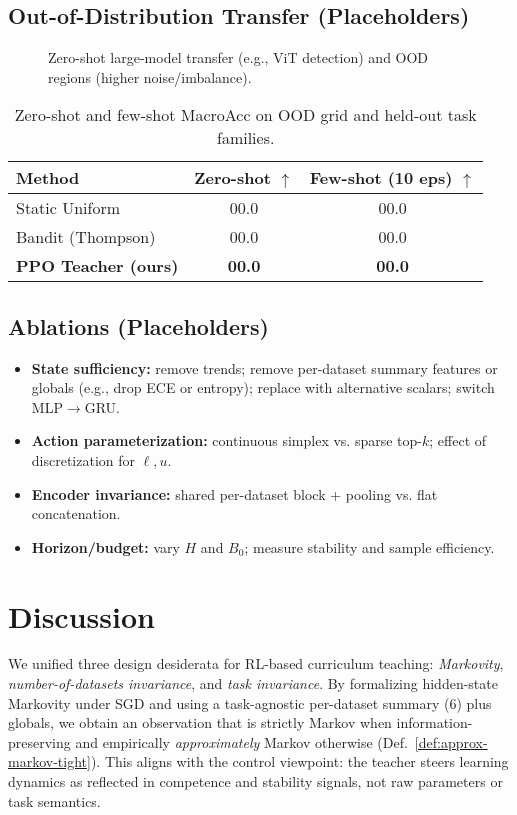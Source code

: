 \documentclass[11pt]{article}
\newcommand{\1}{\mathbf{1}}
\begin{document}
\subsection{Out-of-Distribution Transfer (Placeholders)}
\begin{figure}[H]
  \centering
  \fbox{\rule{0pt}{2in}\rule{0.95\linewidth}{0pt}}
  \caption{Zero-shot large-model transfer (e.g., ViT detection) and OOD regions (higher noise/imbalance).}
  \label{fig:ood}
\end{figure}

\begin{table}[H]
\centering
\caption{Zero-shot and few-shot MacroAcc on OOD grid and held-out task families.}
\label{tab:ood}
\begin{tabular}{lcc}
\toprule
Method & Zero-shot $\uparrow$ & Few-shot (10 eps) $\uparrow$ \\
\midrule
Static Uniform & 00.0 & 00.0 \\
Bandit (Thompson) & 00.0 & 00.0 \\
\textbf{PPO Teacher (ours)} & \textbf{00.0} & \textbf{00.0} \\
\bottomrule
\end{tabular}
\end{table}

\subsection{Ablations (Placeholders)}
\begin{itemize}[leftmargin=1.5em]
\item \textbf{State sufficiency:} remove trends; remove per-dataset summary features or globals (e.g., drop ECE or entropy); replace with alternative scalars; switch MLP$\to$GRU.
\item \textbf{Action parameterization:} continuous simplex vs. sparse top-$k$; effect of discretization for $\ell,u$.
\item \textbf{Encoder invariance:} shared per-dataset block + pooling vs. flat concatenation.
\item \textbf{Horizon/budget:} vary $H$ and $B_0$; measure stability and sample efficiency.
\end{itemize}

\section{Discussion}
We unified three design desiderata for RL-based curriculum teaching: \emph{Markovity}, \emph{number-of-datasets invariance}, and \emph{task invariance}.
By formalizing hidden-state Markovity under SGD and using a task-agnostic per-dataset summary (6) plus globals, we obtain an observation that is strictly Markov when information-preserving and empirically \emph{approximately} Markov otherwise (Def.~\ref{def:approx-markov-tight}).
This aligns with the control viewpoint: the teacher steers learning dynamics as reflected in competence and stability signals, not raw parameters or task semantics.
\end{document}
